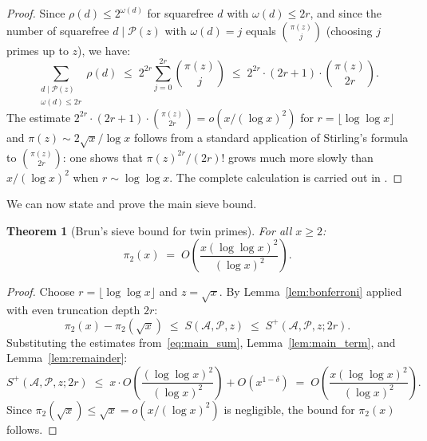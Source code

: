 \documentclass[12pt,a4paper]{amsart}
\newtheorem{theorem}{Theorem}[section]
\theoremstyle{definition}
\begin{document}
\begin{proof}
  Since $\rho(d) \leq 2^{\omega(d)}$ for squarefree $d$ with $\omega(d) \leq 2r$,
  and since the number of squarefree $d \mid \mathcal{P}(z)$ with $\omega(d) = j$
  equals $\binom{\pi(z)}{j}$ (choosing $j$ primes up to $z$), we have:
  \[
    \sum_{\substack{d \mid \mathcal{P}(z)\\ \omega(d)\leq 2r}} \rho(d)
    \;\leq\; 2^{2r} \sum_{j=0}^{2r} \binom{\pi(z)}{j}
    \;\leq\; 2^{2r} \cdot (2r+1) \cdot \binom{\pi(z)}{2r}.
  \]
  The estimate $2^{2r}\cdot(2r+1)\cdot\binom{\pi(z)}{2r} = o\!\left(x/(\log x)^2\right)$
  for $r = \lfloor\log\log x\rfloor$ and $\pi(z) \sim 2\sqrt{x}/\log x$ follows from
  a standard application of Stirling's formula to $\binom{\pi(z)}{2r}$:
  one shows that $\pi(z)^{2r}/(2r)!$ grows much more slowly than $x/(\log x)^2$
  when $r \sim \log\log x$.  The complete calculation is carried out in
  \cite[§2.4]{CojocMurty}.
\end{proof}

We can now state and prove the main sieve bound.

\begin{theorem}[Brun's sieve bound for twin primes]\label{thm:sieve_bound}
  For all $x \geq 2$:
  \[
    \pi_2(x) \;=\; O\!\left(\frac{x(\log\log x)^2}{(\log x)^2}\right).
  \]
\end{theorem}

\begin{proof}
  Choose $r = \lfloor\log\log x\rfloor$ and $z = \sqrt{x}$.  By
  Lemma~\ref{lem:bonferroni} applied with even truncation depth $2r$:
  \[
    \pi_2(x) - \pi_2(\sqrt{x})
    \;\leq\; S(\mathcal{A}, \mathcal{P}, z)
    \;\leq\; S^+(\mathcal{A}, \mathcal{P}, z; 2r).
  \]
  Substituting the estimates from~\eqref{eq:main_sum}, Lemma~\ref{lem:main_term},
  and Lemma~\ref{lem:remainder}:
  \[
    S^+(\mathcal{A}, \mathcal{P}, z; 2r)
    \;\leq\; x \cdot O\!\left(\frac{(\log\log x)^2}{(\log x)^2}\right)
             + O(x^{1-\delta})
    \;=\; O\!\left(\frac{x(\log\log x)^2}{(\log x)^2}\right).
  \]
  Since $\pi_2(\sqrt{x}) \leq \sqrt{x} = o(x/(\log x)^2)$ is negligible,
  the bound for $\pi_2(x)$ follows.
\end{proof}
\end{document}
